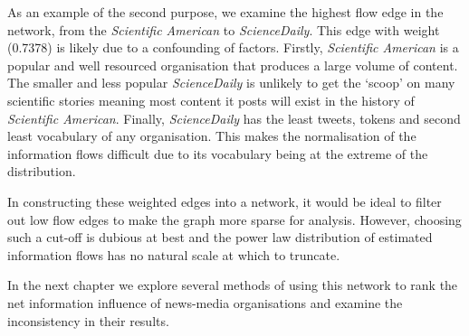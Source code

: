 As an example of the second purpose, we examine the highest flow edge in the network, from the \emph{Scientific American} to \emph{ScienceDaily}.  This edge with weight (0.7378) is likely due to a confounding of factors. Firstly, \emph{Scientific American} is a popular and well resourced organisation that produces a large volume of content. The smaller and less popular \emph{ScienceDaily} is unlikely to get the `scoop' on many scientific stories meaning most content it posts will exist in the history of \emph{Scientific American}. Finally, \emph{ScienceDaily} has the least tweets, tokens and second least vocabulary of any organisation. This makes the normalisation of the information flows difficult due to its vocabulary being at the extreme of the distribution. 

In constructing these weighted edges into a network, it would be ideal to filter out low flow edges to make the graph more sparse for analysis. However, choosing such a cut-off is dubious at best and the power law distribution of estimated information flows has no natural scale at which to truncate. 

In the next chapter we explore several methods of using this network to rank the net information influence of news-media organisations and examine the inconsistency in their results.

